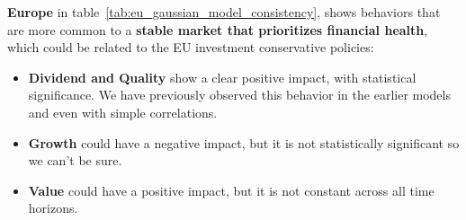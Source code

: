 \documentclass[11pt,english,a4paper,hidelinks]{book}
\begin{document}
\noindent \textbf{Europe} in table~\ref{tab:eu_gaussian_model_consistency}, shows behaviors that are more common to a \textbf{stable market that prioritizes financial health}, which could be related to the EU investment conservative policies:
\begin{itemize}
    \item \textbf{Dividend and Quality} show a clear positive impact, with statistical significance. We have previously observed this behavior in the earlier models and even with simple correlations.
    \item \textbf{Growth} could have a negative impact, but it is not statistically significant so we can't be sure.
    \item \textbf{Value} could have a positive impact, but it is not constant across all time horizons.
\end{itemize}
\end{document}
